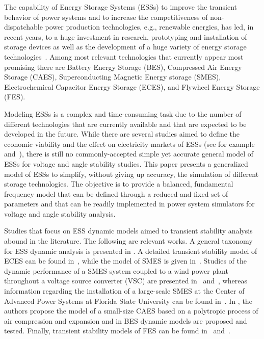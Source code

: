 \documentclass[journal, a4paper]{IEEEtran}
\begin{document}
The capability of Energy Storage Systems (ESSs) to improve the
transient behavior of power systems and to increase the
competitiveness of non-dispatchable power production technologies,
e.g., renewable energies, has led, in recent years, to a huge
investment in research, prototyping and installation of storage
devices as well as the development of a huge variety of energy storage
technologies~\cite{ibrahim:08, beaudin:10, IEC:2011}.  Among most
relevant technologies that currently appear most promising there are
Battery Energy Storage (BES), Compressed Air Energy Storage (CAES),
Superconducting Magnetic Energy storage (SMES), Electrochemical Capacitor Energy
Storage (ECES), and Flywheel Energy Storage (FES).

Modeling ESSs is a complex and time-consuming task due to the number
of different technologies that are currently available and that are
expected to be developed in the future.  While there are several
studies aimed to define the economic viability and the effect on
electricity markets of ESSs (see for example~\cite{beaudin:10}
and~\cite{Awad:14}), there is still no commonly-accepted simple yet
accurate general model of ESSs for voltage and angle stability
studies.  This paper presents a generalized model of ESSs to simplify,
without giving up accuracy, the simulation of different storage
technologies.  The objective is to provide a balanced, fundamental
frequency model that can be defined through a reduced and fixed set of
parameters and that can be readily implemented in power system
simulators for voltage and angle stability analysis.



Studies that focus on ESS dynamic models aimed to
transient stability analysis abound in the literature.
The following are relevant works.  A general taxonomy for ESS dynamic
analysis is presented in \cite{xie:11}.  A detailed 
transient stability model of ECES can be found
in~\cite{intham:13}, while the model of SMES is given
in~\cite{IEEEtaskforce:06}.  Studies of the dynamic performance of a
SMES system coupled to a wind power plant throughout a voltage source
converter (VSC) are presented in~\cite{ali:10} and~\cite{milano:13},
whereas information regarding the installation of a large-scale
  SMES at the Center of Advanced Power Systems at Florida State
  University can be found in~\cite{luongo:03}.  In
\cite{Vongmanee:09}, the authors propose the model of a small-size
CAES based on a polytropic process of air compression and expansion
and in \cite{tremblay:07, shepherd:65} BES dynamic models are proposed
and tested.  Finally, transient stability models of FES can be found
in~\cite{samineni:06} and~\cite{li:06}.
\end{document}
